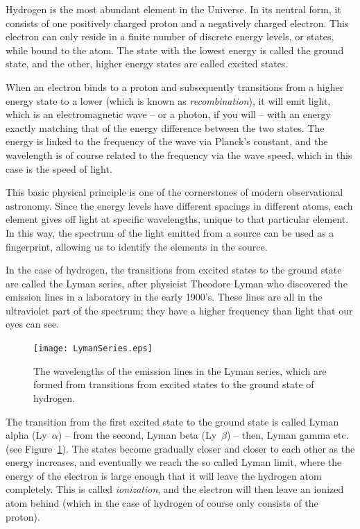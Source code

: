 \documentclass[a4wide,12pt]{book}
\newcommand{\lya}{Ly~${\alpha}$}
\newcommand{\lyb}{Ly~${\beta}$}
\begin{document}
{Hydrogen is the most abundant element in the Universe. In its neutral form, it consists of one positively charged proton and a negatively charged electron. This electron can only reside in a finite number of discrete energy levels, or states, while bound to the atom. The state with the lowest energy is called the ground state, and the other, higher energy states are called excited states. 

When an electron binds to a proton and subsequently transitions from a higher energy state to a lower (which is known as {\em recombination}), it will emit light, which is an electromagnetic wave -- or a photon, if you will -- with an energy exactly matching that of the energy difference between the two states. The energy is linked to the frequency of the wave via Planck's constant, and the wavelength is of course related to the frequency via the wave speed, which in this case is the speed of light. 

This basic physical principle is one of the cornerstones of modern observational astronomy. Since the energy levels have different spacings in different atoms, each element gives off light at specific wavelengths, unique to that particular element. In this way, the spectrum of the light emitted from a source can be used as a fingerprint, allowing us to identify the elements in the source. 

In the case of hydrogen, the transitions from excited states to the ground state are called the Lyman series, after physicist Theodore Lyman who discovered the emission lines in a laboratory in the early 1900's. These lines are all in the ultraviolet part of the spectrum; they have a higher frequency than light that our eyes can see. 

\begin{figure}
   \centering
   \texttt{[image: LymanSeries.eps]}
   \caption{The wavelengths of the emission lines in the Lyman series, which are formed from transitions from excited states to the ground state of hydrogen.}
              \label{Fig:Lyman_states}
    \end{figure}

The transition from the first excited state to the ground state is called Lyman alpha (\lya) -- from the second, Lyman beta (\lyb) -- then, Lyman gamma etc. (see Figure~\ref{Fig:Lyman_states}). The states become gradually closer and closer to each other as the energy increases, and eventually we reach the so called Lyman limit, where the energy of the electron is large enough that it will leave the hydrogen atom completely. This is called {\em ionization}, and the electron will then leave an ionized atom behind (which in the case of hydrogen of course only consists of the proton). 

}
\end{document}
